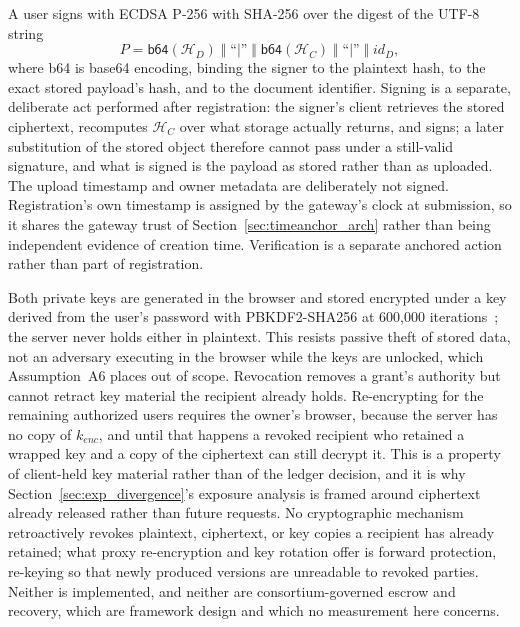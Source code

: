 \documentclass[preprint,12pt]{elsarticle}
\begin{document}
A user signs with ECDSA P-256 with SHA-256 over the digest of the UTF-8
string
\begin{equation}
  P = \textsf{b64}(\mathcal{H}_D) \;\Vert\; \text{``}|\text{''}
      \;\Vert\; \textsf{b64}(\mathcal{H}_C) \;\Vert\; \text{``}|\text{''}
      \;\Vert\; \mathit{id}_D,
  \label{eq:sigpayload}
\end{equation}
where \textsf{b64} is base64 encoding, binding the signer to the plaintext
hash, to the exact stored payload's hash, and to the document identifier.
Signing is a separate, deliberate act performed after registration: the
signer's client retrieves the stored ciphertext, recomputes
$\mathcal{H}_C$ over what storage actually returns, and signs; a later
substitution of the stored object therefore cannot pass under a still-valid
signature, and what is signed is the payload as stored rather than as
uploaded. The upload timestamp and owner metadata are deliberately not
signed. Registration's own timestamp is assigned by the gateway's clock at
submission, so it shares the gateway trust of Section~\ref{sec:timeanchor_arch}
rather than being independent evidence of creation time. Verification is a
separate anchored action rather than part of registration.

\label{sec:keylifecycle}%
Both private keys are generated in the browser and stored encrypted under a key
derived from the user's password with PBKDF2-SHA256 at 600{,}000
iterations~\cite{owaspPasswordStorage2024,nist800132}; the server never holds
either in plaintext. This resists passive theft of stored data, not an adversary
executing in the browser while the keys are unlocked, which Assumption~A6 places
out of scope. Revocation removes a grant's authority but cannot retract key material the
recipient already holds. Re-encrypting for the remaining authorized users
requires the owner's browser, because the server has no copy of $k_{enc}$, and
until that happens a revoked recipient who retained a wrapped key and a copy of
the ciphertext can still decrypt it. This is a property of client-held key
material rather than of the ledger decision, and it is why
Section~\ref{sec:exp_divergence}'s exposure analysis is framed around ciphertext
already released rather than future requests. No cryptographic mechanism retroactively revokes plaintext, ciphertext, or
key copies a recipient has already retained; what proxy re-encryption and
key rotation offer is forward protection, re-keying so that newly produced
versions are unreadable to revoked parties. Neither is implemented, and
neither are consortium-governed escrow and recovery, which are framework
design and which no measurement here concerns.
\end{document}
